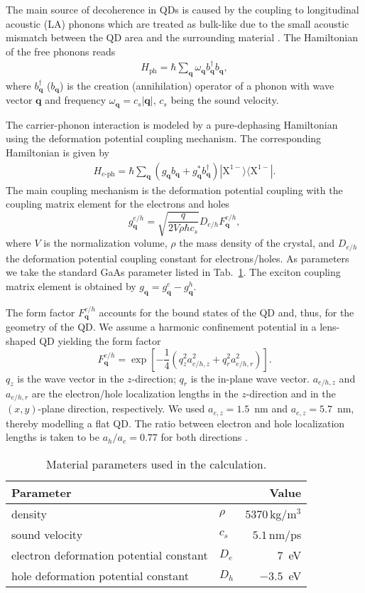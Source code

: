 \documentclass[aps,prl,reprint,superscriptaddress]{revtex4-1}
\begin{document}
The main source of decoherence in QDs is caused by the coupling to longitudinal acoustic (LA) phonons which are treated as bulk-like due to the small acoustic mismatch between the QD area and the surrounding material \cite{Reiter2014}. The Hamiltonian of the free phonons reads
\begin{align*}
H_{\textrm{ph}} = \hbar\sum_{\mathbf{q}}\omega_{\mathbf{q}}b^\dag_{\mathbf{q}}b_{\mathbf{q}},
\end{align*}
where $b^\dag_{\mathbf{q}}$ ($b_{\mathbf{q}}$) is the creation (annihilation) operator of a phonon with wave vector $\mathbf{q}$ and frequency $\omega_{\mathbf{q}} = c_{s}|\mathbf{q}|$, $c_{s}$ being the sound velocity.

The carrier-phonon interaction is modeled by a pure-dephasing Hamiltonian using the deformation potential coupling mechanism. The corresponding Hamiltonian is given by
\begin{align*}
H_{\textrm{c-ph}} = \hbar\sum_{\mathbf{q}} \left(g_{\mathbf{q}}b_{\mathbf{q}} + g^*_{\mathbf{q}}b^\dag_{\mathbf{q}}\right) |\mathrm{X}^{1-} \rangle\langle \mathrm{X}^{1-}| .
\end{align*}
The main coupling mechanism is the deformation potential coupling with the coupling matrix element for the electrons and holes
\[
	g_{\mathbf{q}}^{e/h}=\sqrt{\frac{q}{2V\rho\hbar c_{s}}}D_{e/h}F_{\mathbf{q}}^{e/h},
\]
where $V$ is the normalization volume, $\rho$ the mass density of the crystal, and $D_{e/h}$ the deformation potential coupling constant for electrons/holes. As parameters we take the standard GaAs parameter listed in Tab.~\ref{tab:para}. The exciton coupling matrix element is obtained by $g_{\mathbf{q}} = g_{\mathbf{q}}^{e}- g_{\mathbf{q}}^{h}$.

The form factor $F_{\mathbf{q}}^{e/h}$ accounts for the bound states of the QD and, thus, for the geometry of the QD. We assume a harmonic confinement potential in a lens-shaped QD yielding the form factor
\[
	F_{\mathbf{q}}^{e/h}=\exp\left[-\frac{1}{4}\left(q_z^2 a_{e/h,z}^2+q_{r}^2a_{e/h,r}^2\right)\right].
\]
$q_z$ is the wave vector in the $z$-direction; $q_{r}$ is the in-plane wave vector. $a_{e/h,z}$ and $a_{e/h,r}$ are the electron/hole localization lengths in the $z$-direction and in the $(x,y)$-plane direction, respectively. We used $a_{e,z}=1.5$~nm and $a_{e,z}= 5.7$~nm, thereby modelling a flat QD. The ratio between electron and hole localization lengths is taken to be $a_h/a_e=0.77$ for both directions \cite{warburton2002gia}.

\begin{table}[t]
\begin{tabular}{llr}
\hline \hline
Parameter & & Value \\ \hline
density & $\rho$& $5370\,$kg/m$^3$\\
sound velocity & $c_{s}$ & $5.1\,$nm/ps\\
electron deformation potential constant &$D_e$&$7$~eV\\
hole deformation potential constant &$D_h$&	$-3.5$~eV\\
	\hline \hline
\end{tabular}
\caption{\label{tab:para} Material parameters used in the calculation.}
\end{table}
\end{document}
